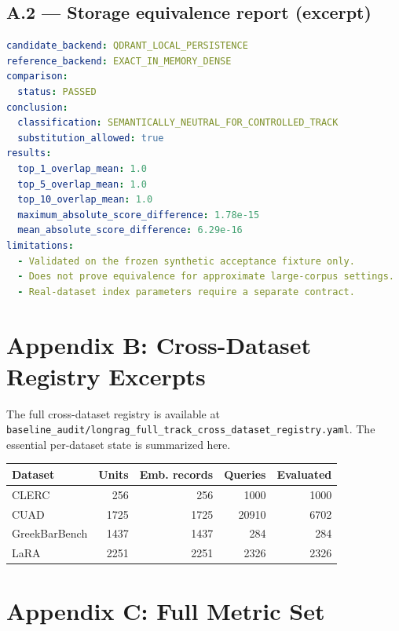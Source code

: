 \documentclass[11pt,a4paper]{article}
\begin{document}
\subsection{A.2 --- Storage equivalence report (excerpt)}
\begin{lstlisting}[language=yaml]
candidate_backend: QDRANT_LOCAL_PERSISTENCE
reference_backend: EXACT_IN_MEMORY_DENSE
comparison:
  status: PASSED
conclusion:
  classification: SEMANTICALLY_NEUTRAL_FOR_CONTROLLED_TRACK
  substitution_allowed: true
results:
  top_1_overlap_mean: 1.0
  top_5_overlap_mean: 1.0
  top_10_overlap_mean: 1.0
  maximum_absolute_score_difference: 1.78e-15
  mean_absolute_score_difference: 6.29e-16
limitations:
  - Validated on the frozen synthetic acceptance fixture only.
  - Does not prove equivalence for approximate large-corpus settings.
  - Real-dataset index parameters require a separate contract.
\end{lstlisting}

\section{Appendix B: Cross-Dataset Registry Excerpts}

The full cross-dataset registry is available at
\texttt{baseline\_audit/longrag\_full\_track\_cross\_dataset\_registry.yaml}.
The essential per-dataset state is summarized here.

\begin{center}
\small
\begin{tabular}{l r r r r}
\toprule
\textbf{Dataset} & \textbf{Units} & \textbf{Emb. records}
  & \textbf{Queries} & \textbf{Evaluated} \\
\midrule
CLERC              & \num{256}   & \num{256}   & \num{1000}  & \num{1000} \\
CUAD               & \num{1725}  & \num{1725}  & \num{20910} & \num{6702} \\
GreekBarBench      & \num{1437}  & \num{1437}  & \num{284}   & \num{284} \\
LaRA               & \num{2251}  & \num{2251}  & \num{2326}  & \num{2326} \\
\bottomrule
\end{tabular}
\end{center}

\section{Appendix C: Full Metric Set}
\end{document}
